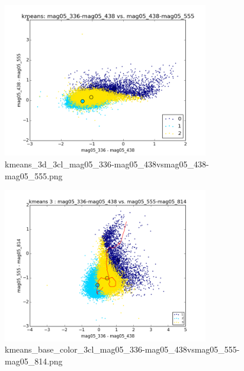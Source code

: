 \documentclass{article}%
\begin{document}
\begin{figure}%
\centering%
\includegraphics[width=0.8\textwidth]{kmeans_3d_3cl_mag05_336-mag05_438vsmag05_438-mag05_555.png}%
\caption{kmeans\_3d\_3cl\_mag05\_336{-}mag05\_438vsmag05\_438{-}mag05\_555.png}%
\end{figure}

%


\begin{figure}%
\centering%
\includegraphics[width=0.8\textwidth]{kmeans_base_color_3cl_mag05_336-mag05_438vsmag05_555-mag05_814.png}%
\caption{kmeans\_base\_color\_3cl\_mag05\_336{-}mag05\_438vsmag05\_555{-}mag05\_814.png}%
\end{figure}

%
\end{document}
